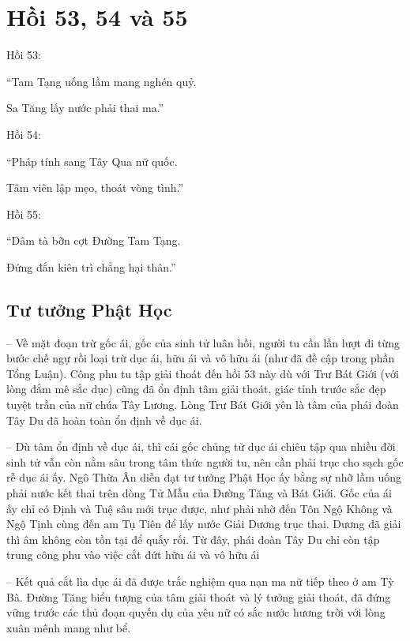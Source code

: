 \chapter{Hồi 53, 54 và 55} %
\label{cha:hoi_53_54}

Hồi 53:

\begin{itshape}
``Tam Tạng uống lầm mang nghén quỷ.

Sa Tăng lấy nước phải thai ma.''
\end{itshape}

Hồi 54:

\begin{itshape}
``Pháp tính sang Tây Qua nữ quốc.

Tâm viên lập mẹo, thoát vòng tình.''
\end{itshape}

Hồi 55:

\begin{itshape}
``Dâm tà bỡn cợt Đường Tam Tạng.

Đứng đắn kiên trì chẳng hại thân.''
\end{itshape}

\section{Tư tưởng Phật Học} %
\label{sec:53_54_phat_hoc}

-- Về mặt đoạn trừ gốc ái, gốc của sinh tử luân hồi, người tu cần lần lượt đi từng bước chế ngự rồi loại trừ dục ái, hữu ái và vô hữu ái (như đã đề cập trong phần Tổng Luận). Công phu tu tập giải thoát đến hồi 53 này dù với Trư Bát Giới (với lòng đắm mê sắc dục) cũng đã ổn định tâm giải thoát, giác tỉnh trước sắc đẹp tuyệt trần của nữ chúa Tây Lương. Lòng Trư Bát Giới yên là tâm của phái đoàn Tây Du đã hoàn toàn ổn định về dục ái.

-- Dù tâm ổn định về dục ái, thì cái gốc chủng tử dục ái chiêu tập qua nhiều đời sinh tử vẫn còn nằm sâu trong tâm thức người tu, nên cần phải trục cho sạch gốc rễ dục ái ấy. Ngô Thừa Ân diễn đạt tư tưởng Phật Học ấy bằng sự nhỡ lầm uống phải nước kết thai trên dòng Tử Mẫu của Đường Tăng và Bát Giới. Gốc của ái ấy chỉ có Định và Tuệ sâu mới trục được, như phải nhờ đến Tôn Ngộ Không và Ngộ Tịnh cùng đến am Tụ Tiên để lấy nước Giải Dương trục thai. Dương đã giải thì âm không còn tồn tại để quấy rối. Từ đây, phái đoàn Tây Du chỉ còn tập trung công phu vào việc cắt đứt hữu ái và vô hữu ái

-- Kết quả cắt lìa dục ái đã được trắc nghiệm qua nạn ma nữ tiếp theo ở am Tỳ Bà. Đường Tăng biểu tượng của tâm giải thoát và lý tưởng giải thoát, đã đứng vững trước các thủ đoạn quyến dụ của yêu nữ có sắc nước hương trời với lòng xuân mênh mang như bể.

